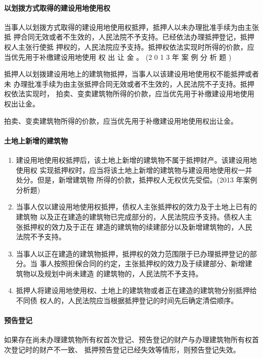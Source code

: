 \documentclass[UTF8,12pt]{ctexart}
\numberwithin{equation}{section} %
\numberwithin{figure}{section}
\numberwithin{table}{section}
\begin{document}
	
	\paragraph{以划拨方式取得的建设用地使用权}
	当事人以划拨方式取得的建设用地使用权抵押，抵押人以未办理批准手续为由主张抵 押合同无效或者不生效的，人民法院不予支持。已经依法办理抵押登记，抵押权人主张行使抵 押权的，人民法院应予支持。抵押权依法实现时所得的价款，应当优先用于补缴建设用地使用 权 出 让 金 。 (2 0 1 3 年 案 例 分 析 题 )
	
	抵押人以划拨建设用地上的建筑物抵押，当事人以该建设用地使用权不能抵押或者未 办理批准手续为由主张抵押合同无效或者不生效的，人民法院不子支持。抵押权依法实现时， 拍卖、变卖建筑物所得的价款，应当优先用于补缴建设用地使用权出让金。
	
	拍卖、变卖建筑物所得的价款，应当优先用于补缴建设用地使用权出让金。
	
	\paragraph{土地上新增的建筑物} 
	\begin{enumerate}
		\item 建设用地使用权抵押后，该土地上新增的建筑物不属于抵押财产。该建设用地使用权 实现抵押权时，应当将该土地上新增的建筑物与建设用地使用权一并处分。但是，新增建筑物 所得的价款，抵押权人无权优先受偿。(2013 年案例分析题)
		
		\item 当事人仅以建设用地使用权抵押，债权人主张抵押权的效力及于土地上已有的建筑物 以及正在建造的建筑物已完成部分的，人民法院应予支持。债权人主张抵押权的效力及于正在 建造的建筑物的续建部分以及新增建筑物的，人民法院不予支持。 
		
		\item 当事人以正在建造的建筑物抵押，抵押权的效力范围限于已办理抵押登记的部分。当 事人按照担保合同的约定，主张抵押权的效力及于续建部分、新增建筑物以及规划中尚未建造 的建筑物的，人民法院不予支持。
		
		\item 抵押人将建设用地使用权、土地上的建筑物或者正在建造的建筑物分别抵押给不同债 权人的，人民法院应当根据抵押登记的时间先后确定清偿顺序。		
	\end{enumerate}

	\paragraph{预告登记}如果存在尚未办理建筑物所有权首次登记、预告登记的财产与办理建筑物所有权首次登记时的财产不一致、 抵押预告登记已经失效等情形，则预告登记失效。
	
\end{document}
